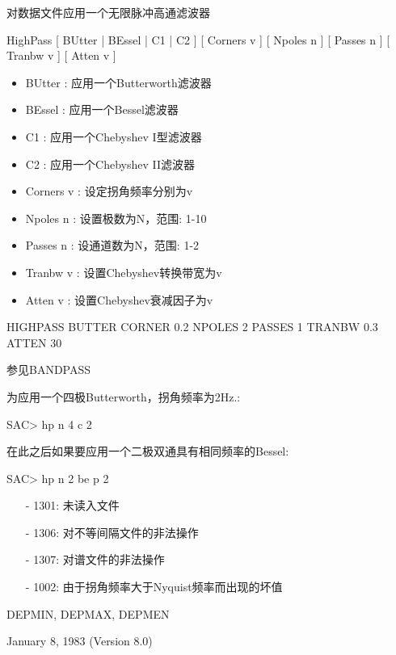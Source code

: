 \label{cmd:highpass}

对数据文件应用一个无限脉冲高通滤波器

HighPass [ BUtter | BEssel | C1 | C2 ] [ Corners v ] [ Npoles n ] [ Passes n ] [ Tranbw v ] [ Atten v ]

\begin{itemize}
\item BUtter : 应用一个Butterworth滤波器 
\item BEssel : 应用一个Bessel滤波器  
\item C1 : 应用一个Chebyshev I型滤波器 
\item C2 : 应用一个Chebyshev II滤波器 
\item Corners v  : 设定拐角频率分别为v  
\item Npoles n : 设置极数为N，范围: 1-10
\item Passes n : 设通道数为N，范围: 1-2
\item Tranbw v : 设置Chebyshev转换带宽为v 
\item Atten v : 设置Chebyshev衰减因子为v
\end{itemize}

HIGHPASS BUTTER CORNER 0.2 NPOLES 2 PASSES 1 TRANBW 0.3 ATTEN 30

参见BANDPASS

为应用一个四极Butterworth，拐角频率为2Hz.:
\begin{SACCode}
SAC> hp n 4 c 2
\end{SACCode}
在此之后如果要应用一个二极双通具有相同频率的Bessel:
\begin{SACCode}
SAC> hp n 2 be p 2
\end{SACCode}

\begin{itemize}
\item[-]1301: 未读入文件
\item[-]1306: 对不等间隔文件的非法操作
\item[-]1307: 对谱文件的非法操作
\item[-]1002: 由于拐角频率大于Nyquist频率而出现的坏值
\end{itemize}

DEPMIN, DEPMAX, DEPMEN

January 8, 1983 (Version 8.0)
